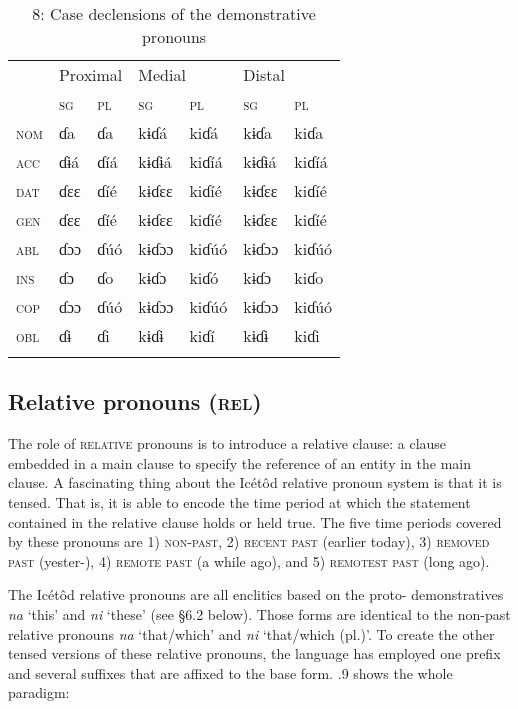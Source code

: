\begin{table}
\caption{8: Case declensions of the demonstrative pronouns}
\label{tab:5}


\begin{tabularx}{\textwidth}{XXXXXXX} & \multicolumn{2}{X}{ Proximal} & \multicolumn{2}{X}{ Medial} & \multicolumn{2}{X}{ Distal}\\
\lsptoprule
& \textsc{sg} & \textsc{pl} & \textsc{sg} & \textsc{pl} & \textsc{sg} & \textsc{pl}\\
\textsc{nom} & ɗa & ɗa & kɨɗá & kiɗá & kɨɗa & kiɗa\\
\textsc{acc} & ɗɨá & ɗíá & kɨɗɨá & kiɗíá & kɨɗɨá & kiɗíá\\
\textsc{dat} & ɗɛɛ & ɗíé & kɨɗɛɛ & kiɗíé & kɨɗɛɛ & kiɗíé\\
\textsc{gen} & ɗɛɛ & ɗíé & kɨɗɛɛ & kiɗíé & kɨɗɛɛ & kiɗíé\\
\textsc{abl} & ɗɔɔ & ɗúó & kɨɗɔɔ & kiɗúó & kɨɗɔɔ & kiɗúó\\
\textsc{ins} & ɗɔ & ɗo & kɨɗɔ & kiɗó & kɨɗɔ & kiɗo\\
\textsc{cop} & ɗɔɔ & ɗúó & kɨɗɔɔ & kiɗúó & kɨɗɔɔ & kiɗúó\\
\textsc{obl} & ɗɨ & ɗi & kɨɗɨ & kiɗí & kɨɗɨ & kiɗi\\
\lspbottomrule
\end{tabularx}
\end{table}



\subsection{Relative pronouns (\textsc{rel})}


The role of \textsc{relative }pronouns is to introduce a relative clause: a clause embedded in a main clause to specify the reference of an entity in the main clause. A fascinating thing about the Icétôd relative pronoun system is that it is tensed. That is, it is able to encode the time period at which the statement contained in the relative clause holds or held true. The five time periods covered by these pronouns are 1) \textsc{non-past}, 2) \textsc{recent past} (earlier today), 3) \textsc{removed past} (yester-), 4) \textsc{remote past} (a while ago), and 5) \textsc{remotest past} (long ago).

The Icétôd relative pronouns are all enclitics based on the proto- demonstratives \textit{na }‘this’ and \textit{ni} ‘these’ (see §6.2 below). Those forms are identical to the non-past relative pronouns \textit{na }‘that/which’ and \textit{ni }‘that/which (pl.)’. To create the other tensed versions of these relative pronouns, the language has employed one prefix and several suffixes that are affixed to the base form. .9 shows the whole paradigm:


